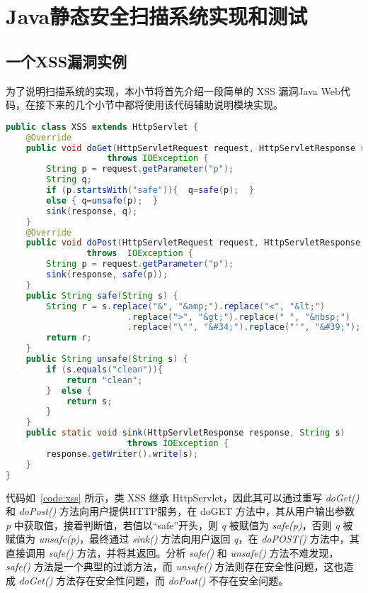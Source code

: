 \chapter{Java静态安全扫描系统实现和测试}
\section{一个XSS漏洞实例}
为了说明扫描系统的实现，本小节将首先介绍一段简单的 XSS 漏洞Java Web代码，在接下来的几个小节中都将使用该代码辅助说明模块实现。

\begin{lstlisting}[language=Java, caption={一段含XSS漏洞的Java代码}, label={code:xss}]
public class XSS extends HttpServlet {
    @Override
    public void doGet(HttpServletRequest request, HttpServletResponse response)
                    throws IOException {
        String p = request.getParameter("p");
        String q;
        if (p.startsWith("safe")){  q=safe(p);  } 
        else { q=unsafe(p);  }
        sink(response, q);
    }
    @Override
    public void doPost(HttpServletRequest request, HttpServletResponse response)
                throws  IOException {
        String p = request.getParameter("p");
        sink(response, safe(p));
    }
    public String safe(String s) {
        String r = s.replace("&", "&amp;").replace("<", "&lt;")
                        .replace(">", "&gt;").replace(" ", "&nbsp;")
                        .replace("\"", "&#34;").replace("'", "&#39;");
        return r;
    }
    public String unsafe(String s) {
        if (s.equals("clean")){
            return "clean";
        }  else {
            return s;
        }
    }
    public static void sink(HttpServletResponse response, String s) 
                        throws IOException {
        response.getWriter().write(s);
    }
}
\end{lstlisting}

代码如~\ref{code:xss} 所示，类 XSS 继承 HttpServlet，因此其可以通过重写 \textit{doGet()} 和 \textit{doPost()} 方法向用户提供HTTP服务，在 doGET 方法中，其从用户输出参数 \textit{p} 中获取值，接着判断值，若值以“safe”开头，则 \textit{q} 被赋值为 \textit{safe(p)}，否则 \textit{q} 被赋值为 \textit{unsafe(p)}，最终通过 \textit{sink()} 方法向用户返回 \textit{q}，在 \textit{doPOST()} 方法中，其直接调用 \textit{safe()} 方法，并将其返回。分析 \textit{safe()} 和 \textit{unsafe()} 方法不难发现，\textit{safe()} 方法是一个典型的过滤方法，而 \textit{unsafe()} 方法则存在安全性问题，这也造成 \textit{doGet()} 方法存在安全性问题，而 \textit{doPost()} 不存在安全问题。

